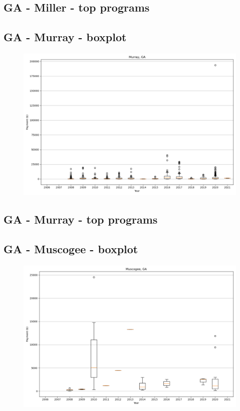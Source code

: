 \subsection*{GA - Miller - top programs}

\newpage
\subsection*{GA - Murray - boxplot}
\begin{figure}[h]
\centering
\includegraphics[width=7in]{../output/boxplots/counties/Murray-GA_boxplot.png}
\end{figure}


\subsection*{GA - Murray - top programs}

\newpage
\subsection*{GA - Muscogee - boxplot}
\begin{figure}[h]
\centering
\includegraphics[width=7in]{../output/boxplots/counties/Muscogee-GA_boxplot.png}
\end{figure}


